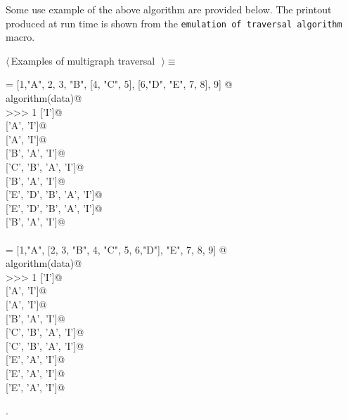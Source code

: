 \documentclass[11pt,oneside]{article}	%
\begin{document}
Some use example of the above algorithm are provided below. The printout produced at run time is shown from the \texttt{emulation of traversal algorithm} macro.
\begin{flushleft} \small \label{scrap32}
$\langle\,$Examples of multigraph traversal\nobreak\ {\footnotesize {}}$\,\rangle\equiv$
\vspace{-1ex}
\begin{list}{}{} \item
\mbox{}\verb@data = [1,"A", 2, 3, "B", [4, "C", 5], [6,"D", "E", 7, 8], 9]  @\\
\mbox{}\verb@print algorithm(data)@\\
\mbox{}\verb@>>> 1 ['I']@\\
\mbox{} ['A', 'I']@\\
\mbox{} ['A', 'I']@\\
\mbox{} ['B', 'A', 'I']@\\
\mbox{} ['C', 'B', 'A', 'I']@\\
\mbox{} ['B', 'A', 'I']@\\
\mbox{} ['E', 'D', 'B', 'A', 'I']@\\
\mbox{} ['E', 'D', 'B', 'A', 'I']@\\
\mbox{} ['B', 'A', 'I']@\\
\mbox{}\verb@@\\
\mbox{}\verb@data = [1,"A", [2, 3, "B", 4, "C", 5, 6,"D"], "E", 7, 8, 9]  @\\
\mbox{}\verb@print algorithm(data)@\\
\mbox{}\verb@>>> 1 ['I']@\\
\mbox{} ['A', 'I']@\\
\mbox{} ['A', 'I']@\\
\mbox{} ['B', 'A', 'I']@\\
\mbox{} ['C', 'B', 'A', 'I']@\\
\mbox{} ['C', 'B', 'A', 'I']@\\
\mbox{} ['E', 'A', 'I']@\\
\mbox{} ['E', 'A', 'I']@\\
\mbox{} ['E', 'A', 'I']@\\
\mbox{}\verb@@{\NWsep}
\end{list}
\vspace{-1ex}
\footnotesize\addtolength{\baselineskip}{-1ex}
\begin{list}{}{\setlength{\itemsep}{-\parsep}\setlength{\itemindent}{-\leftmargin}}
\item {\NWtxtMacroNoRef}.
\end{list}
\end{flushleft}
\end{document}
